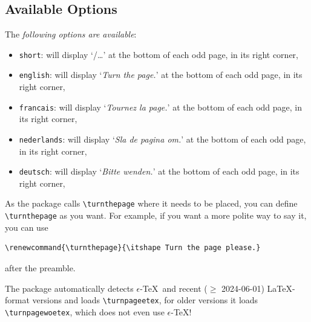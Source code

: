 \documentclass[12pt,a4paper,twoside]{article}
\providecommand{\etex}{$\epsilon$-\TeX}
\begin{document}
\subsection{Available Options\label{subsec:ao}}
The \textit{following options are available}:
\begin{itemize}
\item \verb|short|: will display `/\ldots' at the bottom of each odd page, in its right corner, 
\item \verb|english|: will display `\textit{Turn the page.}' at the bottom of each odd page, in its right corner, 
\item \verb|francais|: will display `\textit{Tournez la page.}' at the bottom of each odd page, in its right corner, 
\item \verb|nederlands|: will display `\textit{Sla de pagina om.}' at the bottom of each odd page, in its right corner, 
\item \verb|deutsch|: will display `\textit{Bitte wenden.}' at the bottom of each odd page, in its right corner, 
\end{itemize}
As the package calls \verb|\turnthepage| where it needs to be placed, you can define \verb|\turnthepage| as you want.
For example, if you want a more polite way to say it, you can use
\begin{verbatim}
\renewcommand{\turnthepage}{\itshape Turn the page please.}
\end{verbatim}
after the preamble.

The package automatically detects \etex\ and recent ($\geq$ 2024-06-01) \LaTeX-format versions and loads \verb|\turnpageetex|,
for older versions it loads \verb|\turnpagewoetex|, which does not even use \etex!
\end{document}
